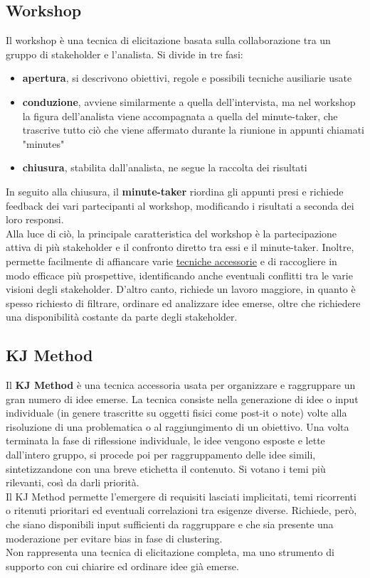 \subsection{Workshop}\label{workshop}
Il workshop è una tecnica di elicitazione basata sulla collaborazione tra un gruppo di stakeholder e l'analista. Si divide in tre fasi:
\begin{itemize}
    \item \textbf{apertura}, si descrivono obiettivi, regole e possibili tecniche ausiliarie usate
    \item \textbf{conduzione}, avviene similarmente a quella dell'intervista, ma nel workshop la figura dell'analista viene accompagnata a quella del minute-taker, che trascrive tutto ciò che viene affermato durante la riunione in appunti chiamati "minutes"
    \item \textbf{chiusura}, stabilita dall'analista, ne segue la raccolta dei risultati
\end{itemize}
In seguito alla chiusura, il \textbf{minute-taker} riordina gli appunti presi e richiede feedback dei vari partecipanti al workshop, modificando i risultati a seconda dei loro responsi. \\
Alla luce di ciò, la principale caratteristica del workshop è la partecipazione attiva di più stakeholder e il confronto diretto tra essi e il minute-taker. Inoltre, permette facilmente di affiancare varie \hyperref[tecniche-accessorie]{tecniche accessorie} e di raccogliere in modo efficace più prospettive, identificando anche eventuali conflitti tra le varie visioni degli stakeholder. D'altro canto, richiede un lavoro maggiore, in quanto è spesso richiesto di filtrare, ordinare ed analizzare idee emerse, oltre che richiedere una disponibilità costante da parte degli stakeholder.
\subsection{KJ Method}\label{kjmethod}
Il \textbf{KJ Method} è una tecnica accessoria usata per organizzare e raggruppare un gran numero di idee emerse. La tecnica consiste nella generazione di idee o input individuale (in genere trascritte su oggetti fisici come post-it o note) volte alla risoluzione di una problematica o al raggiungimento di un obiettivo. Una volta terminata la fase di riflessione individuale, le idee vengono esposte e lette dall'intero gruppo, si procede poi per raggruppamento delle idee simili, sintetizzandone con una breve etichetta il contenuto. Si votano i temi più rilevanti, così da darli priorità. \\
Il KJ Method permette l'emergere di requisiti lasciati implicitati, temi ricorrenti o ritenuti prioritari ed eventuali correlazioni tra esigenze diverse. Richiede, però, che siano disponibili input sufficienti da raggruppare e che sia presente una moderazione per evitare bias in fase di clustering. \\
Non rappresenta una tecnica di elicitazione completa, ma uno strumento di supporto con cui chiarire ed ordinare idee già emerse.